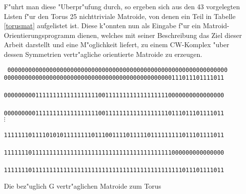 F"uhrt man diese "Uberpr"ufung durch, so ergeben sich aus den 43 vorgelegten
Listen f"ur den Torus 25 nichttriviale Matroide, von denen ein Teil in Tabelle
\ref{torusmat} aufgelistet ist. Diese k"onnten nun als Eingabe f"ur ein
Matroid-Orientierungsprogramm dienen, welches mit seiner Beschreibung das Ziel
dieser Arbeit darstellt und eine M"oglichkeit liefert, zu einem CW-Komplex
"uber dessen Symmetrien vertr"agliche orientierte Matroide zu erzeugen.

\begin{table}[htb]
\begin{center}
{\scriptsize\tt
{}
000000000000000000000000000000000000000000000000000000000000000\\
000000000000000000000000000000000000000000000000111011101111011\\
\\
000000000111111111111111111001111111111111111110000000000000000\\
\\
000000000111111111111111111001111111111111111110111011101111011\\
\hline
$\vdots$\\
\\
111111101111010101111111101110011110111110111111111011101111011\\
\\
111111101111111111111111111111111111111111111111000000000000000\\
\\
111111101111111111111111111111111111111111111111111011101111011\\
\etab
}
\end{center}
\caption{Die bez"uglich G vertr"aglichen Matroide zum Torus}
\label{torusmat}
\end{table}


